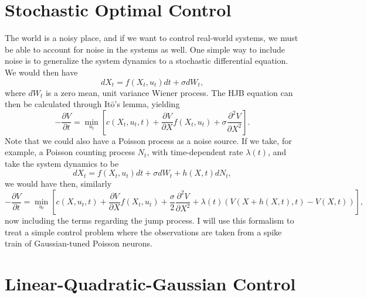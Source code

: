 \section{Stochastic Optimal Control}

The world is a noisy place, and if we want to control real-world systems, we must be able to account for noise in the systems as well. One simple way to include noise is to generalize the system dynamics to a stochastic differential equation. We would then have
$$
dX_t = f(X_t,u_t) dt + \sigma dW_t,
$$
where $dW_t$ is a zero mean, unit variance Wiener process.
The HJB equation can then be calculated through It\=o's lemma, yielding
$$
-\frac{\partial V}{\partial t} = \min_{u_t} \left[c(X_t,u_t,t) + \frac{\partial V}{\partial X} f(X_t,u_t) + \sigma \frac{\partial^2 V}{\partial X^2} \right].
$$
Note that we could also have a Poisson process as a noise source. If we take, for example, a Poisson counting process $N_t$, with time-dependent rate $\lambda(t)$, and take the system dynamics to be
$$
dX_t = f(X_t,u_t) dt + \sigma dW_t + h(X,t) dN_t,
$$
we would have then, similarly
$$
-\frac{\partial V}{\partial t} = \min_{u_t} \left[c(X,u_t,t) + \frac{\partial V}{\partial X} f(X_t,u_t) + \frac{\sigma}{2} \frac{\partial^2 V}{\partial X^2} + \lambda(t) \left(V(X+h(X,t),t)-V(X,t)\right)\right],
$$
now including the terms regarding the jump process.\cite{Theodorou2012,Sennewald2006} I will use this formalism to treat a simple control problem where the observations are taken from a spike train of Gaussian-tuned Poisson neurons.

\section{Linear-Quadratic-Gaussian Control}

